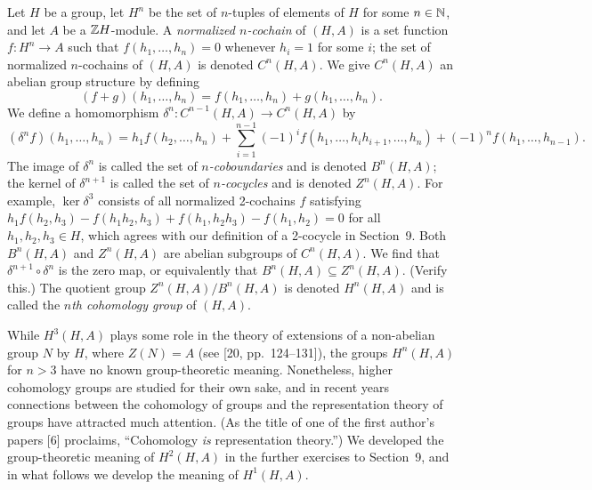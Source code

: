 \documentclass[../Odyssey_Project.tex]{subfiles}
\begin{document}
Let $H$ be a group, let $H^n$ be the set of $n$-tuples of elements of $H$ for some $n \in \mathbb{N}$, and let $A$ be a $\mathbb{Z} H$-module. A \emph{normalized $n$-cochain} of $(H, A)$ is a set function $f \colon H^n \to A$ such that $f(h_1, \ldots, h_n) = 0$ whenever $h_i = 1$ for some $i$; the set of normalized $n$-cochains of $(H, A)$ is denoted $C^n(H, A)$. We give $C^n(H, A)$ an abelian group structure by defining
\[
    (f + g)(h_1, \ldots, h_n) = f(h_1, \ldots, h_n) + g(h_1, \ldots, h_n).
\]
We define a homomorphism $\delta^n \colon C^{n-1}(H, A) \to C^n(H, A)$ by
\[
    (\delta^n f)(h_1, \ldots, h_n) = h_1 f(h_2, \ldots, h_n) + \sum_{i=1}^{n-1} (-1)^i f(h_1, \ldots, h_i h_{i+1}, \ldots, h_n) + (-1)^n f(h_1, \ldots, h_{n-1}).
\]
The image of $\delta^n$ is called the set of \emph{$n$-coboundaries} and is denoted $B^n(H, A)$; the kernel of $\delta^{n+1}$ is called the set of \emph{$n$-cocycles} and is denoted $Z^n(H, A)$. For example, $\ker \delta^3$ consists of all normalized 2-cochains $f$ satisfying $h_1 f(h_2, h_3) - f(h_1 h_2, h_3) + f(h_1, h_2 h_3) - f(h_1, h_2) = 0$ for all $h_1, h_2, h_3 \in H$, which agrees with our definition of a 2-cocycle in Section~9. Both $B^n(H, A)$ and $Z^n(H, A)$ are abelian subgroups of $C^n(H, A)$. We find that $\delta^{n+1} \circ \delta^n$ is the zero map, or equivalently that $B^n(H, A) \subseteq Z^n(H, A)$. (Verify this.) The quotient group $Z^n(H, A) / B^n(H, A)$ is denoted $H^n(H, A)$ and is called the \emph{$n$th cohomology group} of $(H, A)$.

While $H^3(H, A)$ plays some role in the theory of extensions of a non-abelian group $N$ by $H$, where $Z(N) = A$ (see [20, pp.\ 124--131]), the groups $H^n(H, A)$ for $n > 3$ have no known group-theoretic meaning. Nonetheless, higher cohomology groups are studied for their own sake, and in recent years connections between the cohomology of groups and the representation theory of groups have attracted much attention. (As the title of one of the first author's papers [6] proclaims, ``Cohomology \emph{is} representation theory.'') We developed the group-theoretic meaning of $H^2(H, A)$ in the further exercises to Section~9, and in what follows we develop the meaning of $H^1(H, A)$.
\end{document}
